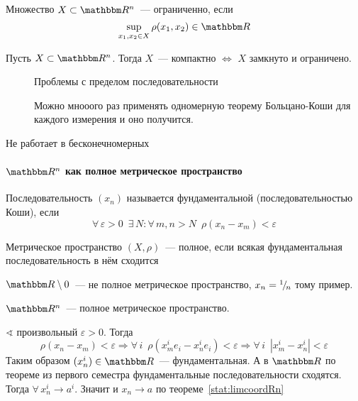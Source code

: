 \documentclass[12pt]{../../notes}
\begin{document}
\begin{defn}\label{defn:limitedsetRn}
  Множество $X\subset \R^n$~--- ограниченно, если 
  \[
    \sup_{x_1, x_2 \in X} \rho (x_1, x_2) \in \R
  \]
\end{defn}

\begin{thrm}\label{thrm:compclosopenRn}
  Пусть $X\subset \R^n$. Тогда $X$~--- компактно $\Leftrightarrow$ $X$ замкнуто и ограничено.
\end{thrm}
\begin{ittproof}
  \begin{description}
    \item[\circlearound{$\Rightarrow$}] Проблемы с пределом последовательности
    \item[\circlearound{$\Leftarrow$}] Можно мнооого раз применять одномерную теорему Больцано-Коши
      для каждого измерения и оно получится.
  \end{description}
\end{ittproof}
\begin{rem*}
  Не работает в бесконечномерных
\end{rem*}

\paragraph{\texorpdfstring{$\R^n$}{} как полное метрическое пространство}

\begin{defn}\label{defn:cauchyseq}
  Последовательность $(x_n)$ называется фундаментальной (последовательностью Коши),
  если 
  \[
    \forall\, \varepsilon > 0 \;\: \exists\, N\colon \forall\,m,n>N \;\: \rho(x_n - x_m) < \varepsilon 
  \]
\end{defn}

\begin{defn}\label{defn:comtmetspc}
  Метрическое пространство $(X,\rho)$~--- полное, если всякая фундаментальная последовательность
  в нём  сходится
\end{defn}

\begin{exmp*}
  $\R \setminus 0$~--- не полное метрическое пространство, $x_n = {}^{1}\!/_{\!n}$ тому пример.
\end{exmp*}

\begin{stat}\label{stat:comtRn}
  $\R^n$~--- полное метрическое пространство.
\end{stat}
\begin{itlproof}
  $\sphericalangle$ произвольный $\varepsilon > 0$. Тогда 
  \[
    \rho(x_n - x_m) < \varepsilon 
    \Rightarrow \forall\, i \;\: \rho(x_m^i e_i - x_n^i e_i) < \varepsilon
    \Rightarrow \forall\, i \;\: |x_m^i - x_n^i| < \varepsilon
  \]
  Таким образом $(x_n^i)\in \R$~--- фундаментальная. 
  А в $\R$ по теореме из первого семестра фундаментальные последовательности сходятся.
  Тогда $\forall\, x_n^i \to a^i$. Значит и $x_n \to a$ по теореме~\ref{stat:limcoordRn}
\end{itlproof}
\end{document}
